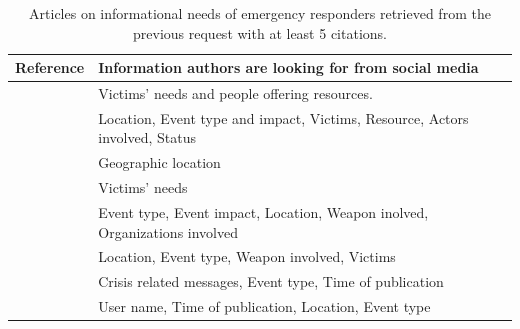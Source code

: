 \begin{table}[bht]
    \centering
    \tabulinesep=1.2mm
    \caption{Articles on informational needs of emergency responders retrieved from the previous request with at least 5 citations.}
    \begin{tabu} to \textwidth {X[1,m]X[3,m]}
        Reference                                            & Information authors are looking for from social media                       \\ [0.5ex]
        \toprule
        \textcite{purohitIdentifyingSeekersSuppliers2014}    & Victims' needs and people offering resources.                               \\
        \textcite{gaurEmpathiOntologyEmergency2019}          & Location, Event type and impact, Victims, Resource, Actors involved, Status \\
        \textcite{ghahremanlouGeotaggingTwitterMessages2014} & Geographic location                                                         \\
        \textcite{bhattAssistingCoordinationCrisis2014}      & Victims' needs                                                              \\
        \textcite{zavarellaOntologybasedApproachSocial2014}  & Event type, Event impact, Location, Weapon inolved, Organizations involved  \\
        \textcite{cocheActionableCollaborativeCommon2019c}   & Location, Event type, Weapon involved, Victims                              \\
        \textcite{montarnalAutomatedEmergenceCrisis2017}     & Crisis related messages, Event type, Time of publication                    \\
        \textcite{leeConstructionEventOntology2013}          & User name, Time of publication, Location, Event type                        \\
        \bottomrule
    \end{tabu}
    \label{table:information-model-social-media}
\end{table}


